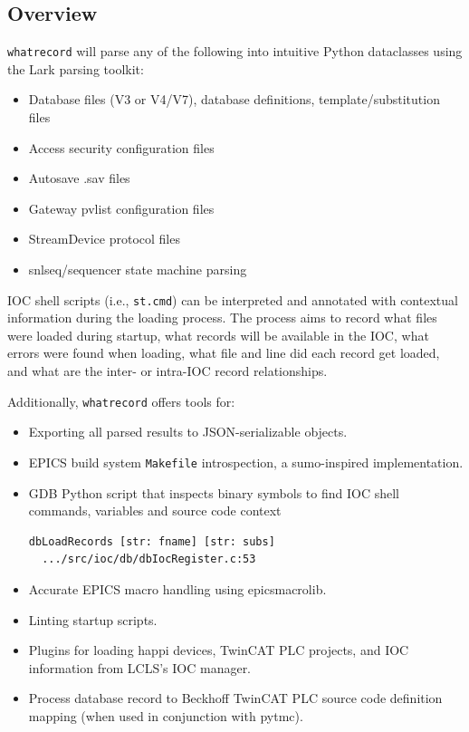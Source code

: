 \documentclass[letter,
               keeplastbox,   %
               ]{jacow}
\begin{document}
\subsection{Overview}
\verb_whatrecord_ will parse any of the following into intuitive Python dataclasses
using the Lark\cite{lark} parsing toolkit:
\begin{itemize}
  \item Database files (V3 or V4/V7), database definitions,
    template/substitution files
  \item Access security configuration files
  \item Autosave .sav files
  \item Gateway pvlist configuration files
  \item StreamDevice protocol files
  \item snlseq/sequencer state machine parsing
\end{itemize}

IOC shell scripts (i.e., \verb_st.cmd_) can be interpreted and annotated with
contextual information during the loading process.  The process aims to record
what files were loaded during startup, what records will be available in the
IOC, what errors were found when loading, what file and line did each record
get loaded, and what are the inter- or intra-IOC record relationships.

Additionally, \verb_whatrecord_ offers tools for:
\begin{itemize}
  \item Exporting all parsed results to JSON-serializable objects.
  \item EPICS build system \verb_Makefile_ introspection, a sumo\cite{sumo}-inspired
    implementation.
  \item GDB Python script that inspects binary symbols to find IOC shell
    commands, variables and source code context
    \begin{lstlisting}[language=bash]
  dbLoadRecords [str: fname] [str: subs]
  .../src/ioc/db/dbIocRegister.c:53
    \end{lstlisting}
  \item Accurate EPICS macro handling using epicsmacrolib\cite{epicsmacrolib}.
  \item Linting startup scripts.
  \item Plugins for loading happi devices, TwinCAT PLC projects, and IOC
    information from LCLS’s IOC manager.
  \item Process database record to Beckhoff TwinCAT PLC source code definition
    mapping (when used in conjunction with pytmc\cite{pytmc}).
\end{itemize}
\end{document}
